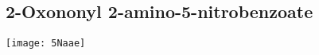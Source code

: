 {{{{{%

\subsection{2-Oxononyl 2-amino-5-nitrobenzoate }


\begin{scheme}[H]
	\begin{center}
		\texttt{[image: 5Naae]}
	\end{center}
\end{scheme}


}}}}}
